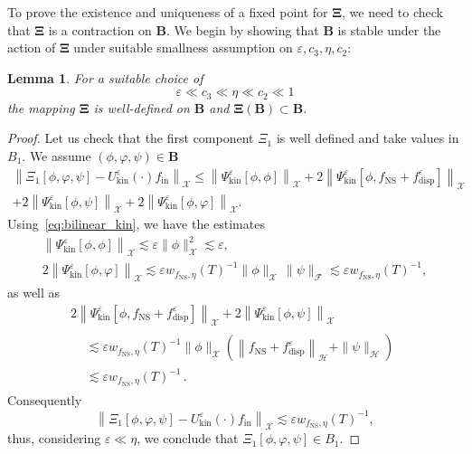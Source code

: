 \documentclass[10pt]{amsart}
\newtheorem{lemm}[theo]{Lemma}\newtheorem{prop}[theo]{Proposition}\newtheorem{coro}[theo]{Corollary}\newtheorem{conj}[theo]{Conjecture}
\theoremstyle{definition}\newtheorem{defi}[theo]{Definition}\newtheorem{rema}[theo]{Remark}\newtheorem{exam}[theo]{Example}\newtheorem{exem}[theo]{Example}\newtheorem{nota}[theo]{Notation}
\newcommand{\ini}{\mathrm{in}}
\newcommand{\ns}{\mathrm{NS}}
\newcommand{\kin}{\mathrm{kin}}
\newcommand{\disp}{\mathrm{disp}}
\newcommand{\FFF}{\mathscr{F}}
\newcommand{\HHH}{\mathscr{H}}
\newcommand{\GGG}{\mathscr{X}}
\newcommand{\SSSs}{\HHH}
\newcommand{\SSSl}{\GGG}
\newcommand{\SSSm}{\FFF}
\renewcommand*\le{\leqslant}
\newcommand*\eps{{\varepsilon}}
\begin{document}
To prove the existence and uniqueness of a fixed point for $\bm{\Xi}$, we need to check that $\bm{\Xi}$ is a contraction on $\bm{B}$. We begin by showing that $\bm{B}$ is stable under the action of $\bm{\Xi}$ under suitable smallness assumption on $\eps,c_3,\eta,c_2$:
\begin{lemm}\label{lemm6.5}
For a suitable choice of
\[
\eps \ll c_3 \ll \eta \ll c_2 \ll 1
\]
the mapping $\bm{\Xi}$ is well-defined on $\bm{B}$ and $\bm{\Xi}(\bm{B}) \subset \bm{B}.$
\end{lemm}

\begin{proof}
Let us check that the first component $\Xi_1$ is well defined and take values in $B_1$. We assume $(\phi,\varphi,\psi) \in \bm{B}$
\begin{multline*}
\left\| \Xi_1\left[\phi, \varphi, \psi\right] - U^\eps_\kin(\cdot) f_\ini \right\|_{\SSSl} \le  \left\| \Psi^\eps_\kin\left[\phi, \phi\right] \right\|_{\SSSl} + 2 \left\| \Psi^\eps_\kin\left[\phi, f_\ns + f^\eps_\disp \right] \right\|_{\SSSl} \\
 + 2 \left\| \Psi^\eps_\kin\left[\phi, \psi\right] \right\|_{ \SSSl } + 2 \left\| \Psi^\eps_\kin\left[\phi, \varphi\right] \right\|_{ \SSSl }.
\end{multline*}
Using~\eqref{eq:bilinear_kin}, we have the estimates
\begin{gather*}
\left\| \Psi^\eps_\kin\left[\phi, \phi\right] \right\|_{\SSSl} \lesssim \eps \| \phi\|_{\SSSl}^2 \lesssim \eps,
\\
2 \left\| \Psi^\eps_\kin \left[\phi, \varphi\right] \right\|_{ \SSSl }  \lesssim \eps w_{f_\ns, \eta }(T)^{-1}\| \phi\|_{\SSSl}\,\| \psi\|_{\SSSm} \lesssim \eps w_{f_\ns, \eta }(T)^{-1},
\end{gather*}
as well as
\begin{multline*}
2 \left\| \Psi^\eps_\kin\left[\phi, f_\ns + f^\eps_\disp \right] \right\|_{\SSSl} + 2 \left\| \Psi^\eps_\kin\left[\phi, \psi\right]\right\|_{ \SSSl }\\
\begin{aligned}
&\lesssim \eps w_{f_\ns,\eta}(T)^{-1}\| \phi\|_{\SSSl}\left(\left\| f_\ns +f^\eps_\disp \right\|_{\SSSs} + \| \psi \|_{\SSSs} \right)
\\
&\lesssim \eps w_{f_\ns, \eta}(T)^{-1}\,.
\end{aligned}
\end{multline*}
Consequently
\[
\left\| \Xi_1\left[\phi, \varphi, \psi\right] - U^\eps_\kin(\cdot) f_\ini \right\|_{\SSSl} \lesssim \eps w_{f_\ns, \eta}(T)^{-1},
\]
thus, considering $\eps \ll \eta$, we conclude that $\Xi_1[\phi,\varphi,\psi] \in B_1$.


\end{proof}
\end{document}
